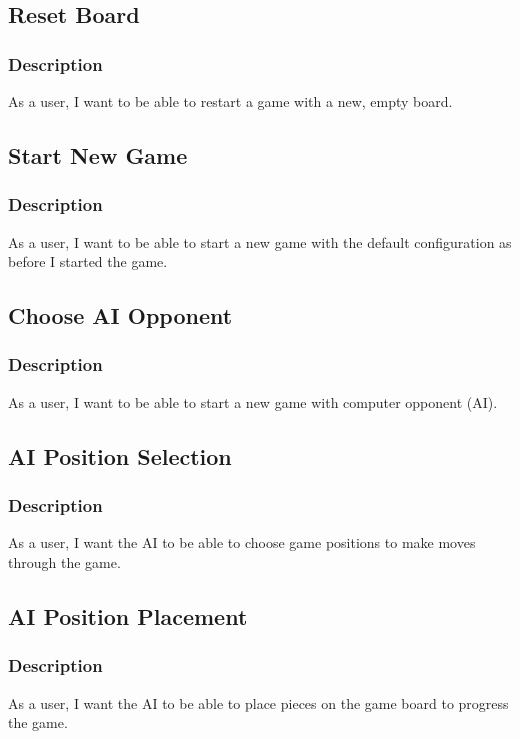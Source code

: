 \documentclass[11pt]{article}
\begin{document}
\subsection{Reset Board}
\label{sec:org5e90d2f}
\subsubsection*{Description}
\label{sec:org3c1727e}
As a user, I want to be able to restart a game with a new, empty board.

\subsection{Start New Game}
\label{sec:orgc7da472}
\subsubsection*{Description}
\label{sec:org7fb1c09}
As a user, I want to be able to start a new game with the default configuration as before I started the game.

\subsection{Choose AI Opponent}
\label{sec:org7f9a07f}
\subsubsection*{Description}
\label{sec:orgaae8f6a}
As a user, I want to be able to start a new game with computer opponent (AI).


\subsection{AI Position Selection}
\label{sec:org5cd5738}
\subsubsection*{Description}
\label{sec:org433663a}
As a user, I want the AI to be able to choose game positions to make moves through the game.


\subsection{AI Position Placement}
\label{sec:orgca7949c}
\subsubsection*{Description}
\label{sec:orgfa70593}
As a user, I want the AI to be able to place pieces on the game board to progress the game.
\end{document}
